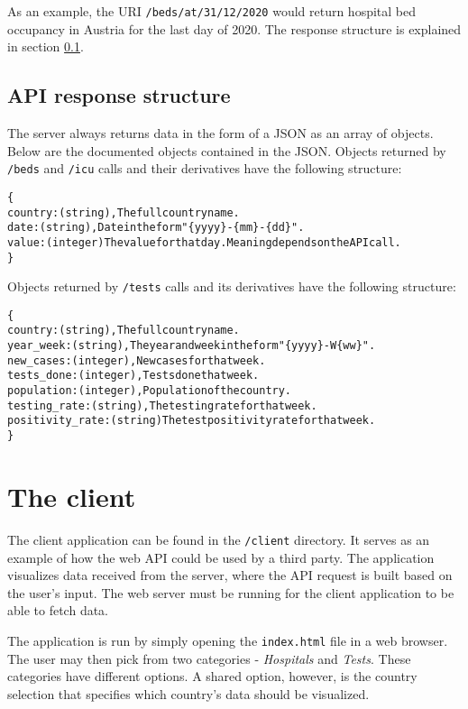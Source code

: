 \documentclass[pdftex, 11pt, a4paper]{article}
\newcommand{\code}{\texttt}
\begin{document}
    As an example, the URI \code{/beds/at/31/12/2020} would return hospital bed occupancy
    in Austria for the last day of 2020. The response structure is explained in
    section \ref{sec:api_response}.

    \subsection{API response structure} \label{sec:api_response}
    The server always returns data in the form of a JSON as an array of objects.
    Below are the documented objects contained in the JSON.\newline
    Objects returned by \code{/beds} and \code{/icu} calls and their derivatives
    have the following structure:
    \begin{alltt}
    \{
        country: (string),  The full country name.
        date: (string),     Date in the form "\{yyyy\}-\{mm\}-\{dd\}".
        value: (integer)    The value for that day. Meaning depends on the API call.
    \}
    \end{alltt}
    Objects returned by \code{/tests} calls and its derivatives
    have the following structure:
    \begin{alltt}
    \{
        country: (string),          The full country name.
        year_week: (string),        The year and week in the form "\{yyyy\}-W\{ww\}".
        new_cases: (integer),       New cases for that week.
        tests_done: (integer),      Tests done that week.
        population: (integer),      Population of the country.
        testing_rate: (string),     The testing rate for that week.
        positivity_rate: (string)   The test positivity rate for that week.
    \}
    \end{alltt}

    \section{The client}
    The client application can be found in the \code{/client} directory. It serves as
    an example of how the web API could be used by a third party. The application
    visualizes data received from the server, where the API request is built based on
    the user's input. The web server must be running for the client application to
    be able to fetch data.

    The application is run by simply opening the \code{index.html} file in a web browser.
    The user may then pick from two categories - \emph{Hospitals} and \emph{Tests}. These
    categories have different options. A shared option, however, is the country selection
    that specifies which country's data should be visualized.
\end{document}
